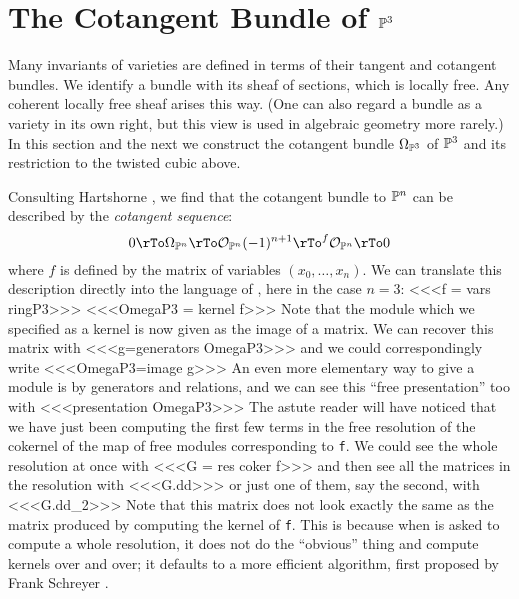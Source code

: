 \section{The Cotangent Bundle of $\P^3$}

%
Many invariants of varieties are defined in
terms of their tangent and cotangent bundles. We 
identify a bundle with its sheaf of
sections, which is locally free.
Any coherent locally free sheaf arises this way.
(One can also regard a bundle
as a variety in its own right, but this view
is used in algebraic geometry more rarely.)
In this section and the next we construct
the cotangent  bundle $\Omega_{\P^3}$ of $\P^3$ and
its restriction to the twisted cubic above.

Consulting Hartshorne \cite[Theorem II.8.13]{Hartshorne}, we find 
that the cotangent bundle to $\P^n$ can be described
by the {\it cotangent sequence\/}:
%
$$
0\rTo 
\Omega_{\P^n}\rTo 
\cO_{\P^n}(-1)^{n+1}\rTo^f 
\cO_{\P^n} \rTo 
0
$$
where $f$ is defined by the matrix 
of variables $(x_0,\dots,x_n)$.
We can translate this description directly into the 
language of \Mtwo, here in the case $n=3$:
<<<f = vars ringP3>>>
%
<<<OmegaP3 = kernel f>>>
%
Note that the module which we specified as a kernel
is now given as the image of a matrix. We can recover this
matrix with
<<<g=generators OmegaP3>>>
and we could correspondingly write
%
<<<OmegaP3=image g>>>
An even more elementary way to give a module is by generators
and relations, and we can see this ``free presentation'' too with
%
<<<presentation OmegaP3>>>
The astute reader will have noticed that we have just been computing
the first few terms in the free resolution of the cokernel of the
map of free modules corresponding to
{\tt f}. We could see the whole resolution at once with
<<<G = res coker f>>>
and then see all the matrices in the resolution with
<<<G.dd>>>
or just one of them, say the second, with
<<<G.dd_2>>>
Note that this matrix does not look exactly the same as
the matrix produced by computing the kernel of {\tt f}.
This is because when \Mtwo is asked to compute a whole
resolution, it does not do the ``obvious'' thing and
compute kernels over and over; it defaults to a more efficient
algorithm, first proposed by Frank Schreyer
\cite[Appendix]{s1}.

